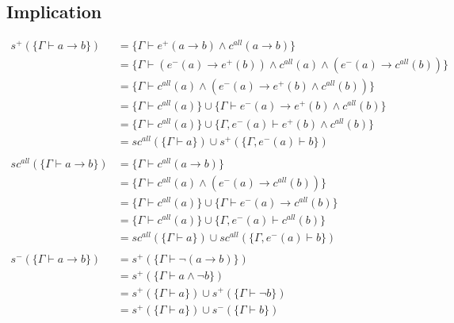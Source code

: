 \documentclass[12pt]{article}
\begin{document}
\subsection*{Implication}
\begin{align*}
  s^+ (\{\Gamma \vdash a \rightarrow b\})      & = \{\Gamma \vdash e^+(a \rightarrow b) \land c^{all} (a \rightarrow b)\}                                 \\
                                               & = \{\Gamma \vdash (e^-(a) \rightarrow e^+(b)) \land c^{all} (a) \land (e^-(a) \rightarrow c^{all} (b))\} \\
                                               & = \{\Gamma \vdash c^{all} (a) \land (e^-(a) \rightarrow e^+(b) \land c^{all} (b))\}                      \\
                                               & = \{\Gamma \vdash c^{all} (a)\} \cup \{\Gamma \vdash e^-(a) \rightarrow e^+(b) \land c^{all} (b)\}       \\
                                               & = \{\Gamma \vdash c^{all} (a)\} \cup \{\Gamma, e^-(a) \vdash e^+(b) \land c^{all} (b)\}                  \\
                                               & = sc^{all} (\{\Gamma \vdash a\}) \cup s^+ (\{\Gamma, e^- (a) \vdash b\})                                 \\
  \\
  sc^{all} (\{\Gamma \vdash a \rightarrow b\}) & = \{\Gamma \vdash c^{all}(a \rightarrow b)\}                                                             \\
                                               & = \{\Gamma \vdash c^{all}(a) \land (e^-(a) \rightarrow c^{all}(b))\}                                     \\
                                               & = \{\Gamma \vdash c^{all}(a)\} \cup \{\Gamma \vdash e^-(a) \rightarrow c^{all}(b)\}                      \\
                                               & = \{\Gamma \vdash c^{all}(a)\} \cup \{\Gamma, e^-(a) \vdash c^{all}(b)\}                                 \\
                                               & = sc^{all} (\{\Gamma \vdash a\}) \cup sc^{all} (\{\Gamma, e^- (a) \vdash b\})                            \\
  \\
  s^- (\{\Gamma \vdash a \rightarrow b\})      & = s^+ (\{\Gamma \vdash \neg (a \rightarrow b)\})                                                         \\
                                               & = s^+ (\{\Gamma \vdash a \land \neg b\})                                                                 \\
                                               & = s^+ (\{\Gamma \vdash a\}) \cup s^+ (\{\Gamma \vdash \neg b\})                                          \\
                                               & = s^+ (\{\Gamma \vdash a\}) \cup s^- (\{\Gamma \vdash b\})                                               \\
\end{align*}
\end{document}

